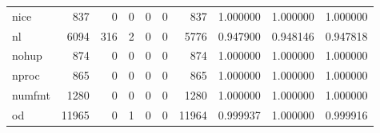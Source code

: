 \begin{longtable}{lrrrrrrrrr}
nice      &                                 837 &                                               0 &                                              0 &                                             0 &                                              0 &                                          837 &                                           1.000000 &                               1.000000 &                             1.000000 \\
nl        &                                6094 &                                             316 &                                              2 &                                             0 &                                              0 &                                         5776 &                                           0.947900 &                               0.948146 &                             0.947818 \\
nohup     &                                 874 &                                               0 &                                              0 &                                             0 &                                              0 &                                          874 &                                           1.000000 &                               1.000000 &                             1.000000 \\
nproc     &                                 865 &                                               0 &                                              0 &                                             0 &                                              0 &                                          865 &                                           1.000000 &                               1.000000 &                             1.000000 \\
numfmt    &                                1280 &                                               0 &                                              0 &                                             0 &                                              0 &                                         1280 &                                           1.000000 &                               1.000000 &                             1.000000 \\
od        &                               11965 &                                               0 &                                              1 &                                             0 &                                              0 &                                        11964 &                                           0.999937 &                               1.000000 &                             0.999916 \\

\end{longtable}
